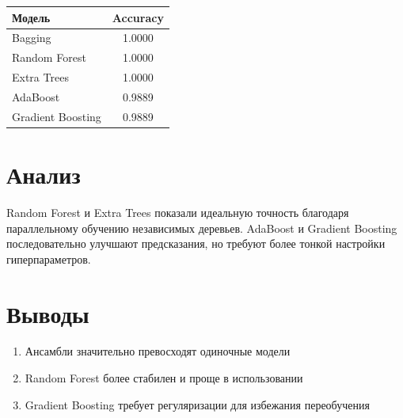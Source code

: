 \documentclass[a4paper,12pt]{article}
\begin{document}
\begin{center}
\begin{tabular}{|l|c|}
\hline
\textbf{Модель} & \textbf{Accuracy} \\
\hline
Bagging & 1.0000 \\
\hline
Random Forest & 1.0000 \\
\hline
Extra Trees & 1.0000 \\
\hline
AdaBoost & 0.9889 \\
\hline
Gradient Boosting & 0.9889 \\
\hline
\end{tabular}
\end{center}

\section*{Анализ}

Random Forest и Extra Trees показали идеальную точность благодаря параллельному обучению независимых деревьев. AdaBoost и Gradient Boosting последовательно улучшают предсказания, но требуют более тонкой настройки гиперпараметров.

\section*{Выводы}

\begin{enumerate}
    \item Ансамбли значительно превосходят одиночные модели
    \item Random Forest более стабилен и проще в использовании
    \item Gradient Boosting требует регуляризации для избежания переобучения
\end{enumerate}
\end{document}
